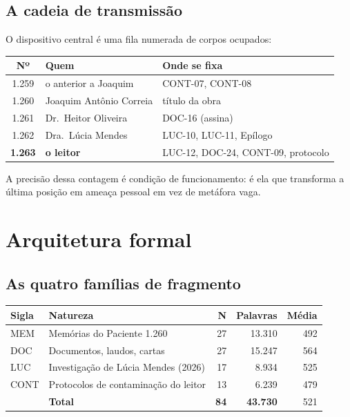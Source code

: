 \documentclass[11pt,a4paper]{article}
\begin{document}
\subsection{A cadeia de transmissão}

O dispositivo central é uma fila numerada de corpos ocupados:

\begin{center}\small
\begin{tabular}{@{}cll@{}}
\toprule
\textbf{Nº} & \textbf{Quem} & \textbf{Onde se fixa} \\
\midrule
1.259 & o anterior a Joaquim & CONT-07, CONT-08 \\
1.260 & Joaquim Antônio Correia & título da obra \\
1.261 & Dr.\ Heitor Oliveira & DOC-16 (assina) \\
1.262 & Dra.\ Lúcia Mendes & LUC-10, LUC-11, Epílogo \\
\textbf{1.263} & \textbf{o leitor} & LUC-12, DOC-24, CONT-09, protocolo \\
\bottomrule
\end{tabular}
\end{center}

A precisão dessa contagem é condição de funcionamento: é ela que transforma
a última posição em ameaça pessoal em vez de metáfora vaga.

\section{Arquitetura formal}

\subsection{As quatro famílias de fragmento}

\begin{center}\small
\begin{tabular}{@{}llrrr@{}}
\toprule
\textbf{Sigla} & \textbf{Natureza} & \textbf{N} & \textbf{Palavras} & \textbf{Média} \\
\midrule
MEM  & Memórias do Paciente 1.260 & 27 & 13.310 & 492 \\
DOC  & Documentos, laudos, cartas & 27 & 15.247 & 564 \\
LUC  & Investigação de Lúcia Mendes (2026) & 17 & 8.934 & 525 \\
CONT & Protocolos de contaminação do leitor & 13 & 6.239 & 479 \\
\midrule
     & \textbf{Total} & \textbf{84} & \textbf{43.730} & 521 \\
\bottomrule
\end{tabular}
\end{center}
\end{document}
